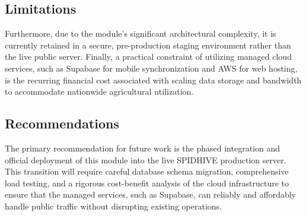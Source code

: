 \documentclass{icsthesis}
\begin{document}
\begin{mainmatter}
            \subsection{Limitations}
            Furthermore, due to the module's significant architectural complexity, it is currently retained in a secure, pre-production staging environment rather than the live public server. Finally, a practical constraint of utilizing managed cloud services, such as Supabase for mobile synchronization and AWS for web hosting, is the recurring financial cost associated with scaling data storage and bandwidth to accommodate nationwide agricultural utilization.
            
            \subsection{Recommendations}
            The primary recommendation for future work is the phased integration and official deployment of this module into the live SPIDHIVE production server. This transition will require careful database schema migration, comprehensive load testing, and a rigorous cost-benefit analysis of the cloud infrastructure to ensure that the managed services, such as Supabase, can reliably and affordably handle public traffic without disrupting existing operations.
		
			
	\end{mainmatter}
\end{document}
